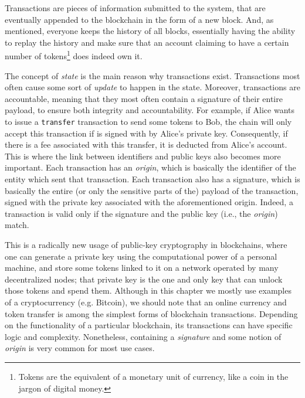
Transactions are pieces of information submitted to the system, that are eventually appended to the
blockchain in the form of a new block. And, as mentioned, everyone keeps the history of all blocks,
essentially having the ability to replay the history and make sure that an account claiming to have
a certain number of tokens\footnote{Tokens are the equivalent of a monetary unit of currency, like a
coin in the jargon of digital money.} does indeed own it.

The concept of \textit{state} is the main reason why transactions exist. Transactions most often
cause some sort of \textit{update} to happen in the state. Moreover, transactions are accountable,
meaning that they most often contain a signature of their entire payload, to ensure both integrity
and accountability. For example, if Alice wants to issue a \texttt{transfer} transaction to send
some tokens to Bob, the chain will only accept this transaction if is signed with by Alice's private
key. Consequently, if there is a fee associated with this transfer, it is deducted from Alice's
account. This is where the link between identifiers and public keys also becomes more important.
Each transaction has an \textit{origin}, which is basically the identifier of the entity which sent
that transaction. Each transaction also has a signature, which is basically the entire (or only the
sensitive parts of the) payload of the transaction, signed with the private key associated with the
aforementioned origin. Indeed, a transaction is valid only if the signature and the public key
(i.e., the \textit{origin}) match.

This is a radically new usage of public-key cryptography in blockchains, where one can generate a
private key using the computational power of a personal machine, and store some tokens linked to it
on a network operated by many decentralized nodes; that private key is the one and only key that can
unlock those tokens and spend them. Although in this chapter we mostly use examples of a
cryptocurrency (e.g. Bitcoin), we should note that an online currency and token transfer is among
the simplest forms of blockchain transactions. Depending on the functionality of a particular
blockchain, its transactions can have specific logic and complexity. Nonetheless, containing a
\textit{signature} and some notion of \textit{origin} is very common for most use cases.

